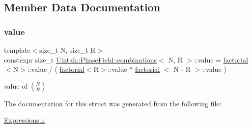 \subsection{Member Data Documentation}
\mbox{\label{structUintah_1_1PhaseField_1_1combinations_af4ee057e220b323e71a7bfb2107af0a1}} 
\subsubsection{\texorpdfstring{value}{value}}
{\footnotesize\ttfamily template$<$size\+\_\+t N, size\+\_\+t R$>$ \\
constexpr size\+\_\+t \hyperlink{structUintah_1_1PhaseField_1_1combinations}{Uintah\+::\+Phase\+Field\+::combinations}$<$ N, R $>$\+::value = \hyperlink{structUintah_1_1PhaseField_1_1factorial}{factorial}$<$N$>$\+::value / ( \hyperlink{structUintah_1_1PhaseField_1_1factorial}{factorial}$<$R$>$\+::value $\ast$ \hyperlink{structUintah_1_1PhaseField_1_1factorial}{factorial} $<$ N -\/ R $>$\+::value )\hspace{0.3cm}{\ttfamily [static]}}



value of $ N\choose R $ 



The documentation for this struct was generated from the following file\+:\begin{DoxyCompactItemize}
\item 
\hyperlink{Expressions_8h}{Expressions.\+h}\end{DoxyCompactItemize}
